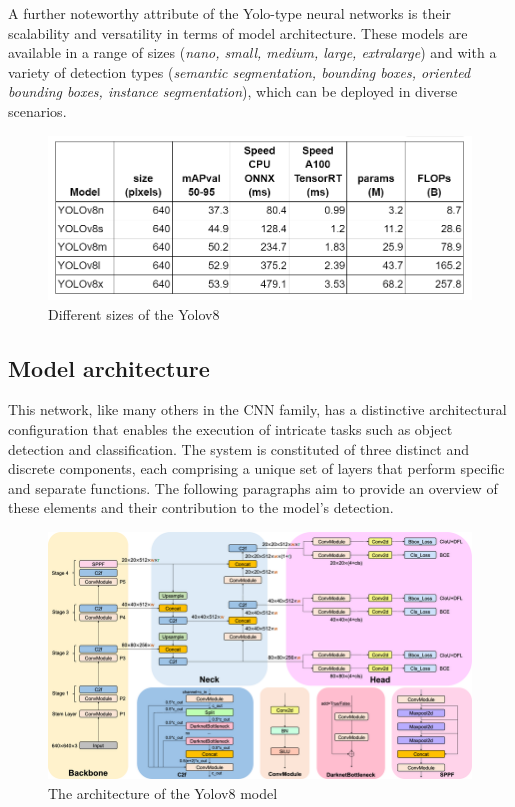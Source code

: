 A further noteworthy attribute of the Yolo-type neural networks is their scalability and versatility in terms of model architecture.
These models are available in a range of sizes (\textit{nano, small, medium, large, extralarge}) and with a variety of detection types (\textit{semantic segmentation, bounding boxes,
oriented bounding boxes, instance segmentation}), which can be deployed in diverse scenarios.




\begin{figure}[ht]
\includegraphics[width=1.0\textwidth]{figures/table1}
\caption{Different sizes of the Yolov8~\cite{githubGitHubUltralyticsultralytics}}
\label{fig:tableofsizes}
\end{figure}


\subsection{Model architecture}\label{subsec:architecture}
This network, like many others in the CNN family, has a distinctive architectural configuration that
enables the execution of intricate tasks such as object detection and classification.
The system is constituted of three distinct and discrete components,
each comprising a unique set of layers that perform specific and separate functions.
The following paragraphs aim to provide an overview of these elements and their contribution to the model's detection.

\begin{figure}[ht]
\includegraphics[width=1.0\textwidth]{figures/Detailed-illustration-of-YOLOv8-model-architecture-The-Backbone-Neck-and-Head-are-the}
\caption{The architecture of the Yolov8 model~\cite{FractureDetection2024}}
\label{fig:architecture}
\end{figure}

